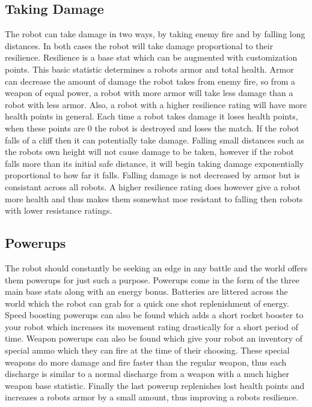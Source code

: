 \documentclass[a4paper]{article}
\begin{document}
\subsection{Taking Damage}

The robot can take damage in two ways, by taking enemy fire and by falling long distances. In both cases the robot will take damage proportional to their resilience. Resilience is a base stat which can be augmented with customization points. This basic statistic determines a robots armor and total health. Armor can decrease the amount of damage the robot takes from enemy fire, so from a weapon of equal power, a robot with more armor will take less damage than a robot with less armor. Also, a robot with a higher resilience rating will have more health points in general. Each time a robot takes damage it loses health points, when these points are 0 the robot is destroyed and loses the match. If the robot falls of a cliff then it can potentially take damage. Falling small distances such as the robots own height will not cause damage to be taken, however if the robot falls more than its initial safe distance, it will begin taking damage exponentially proportional to how far it falls. Falling damage is not decreased by armor but is consistant across all robots. A higher resilience rating does however give a robot more health and thus makes them somewhat moe resistant to falling then robots with lower resistance ratings.\\

\subsection{Powerups}

The robot should constantly be seeking an edge in any battle and the world offers them powerups for just such a purpose. Powerups come in the form of the three main base stats along with an energy bonus. Batteries are littered across the world which the robot can grab for a quick one shot replenishment of energy. Speed boosting powerups can also be found which adds a short rocket booster to your robot which increases its movement rating drastically for a short period of time. Weapon powerups can also be found which give your robot an inventory of special ammo which they can fire at the time of their choosing. These special weapons do more damage and fire faster than the regular weapon, thus each discharge is similar to a normal discharge from a weapon with a much higher weapon base statistic. Finally the last powerup replenishes lost health points and increases a robots armor by a small amount, thus improving a robots resilience.\\
\end{document}
